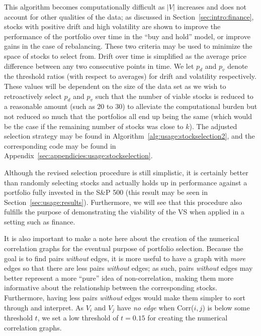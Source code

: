 This algorithm becomes computationally difficult as $|V|$ increases and does 
not account for other qualities of the data; as discussed in 
Section~\ref{sec:intro:finance}, stocks with positive drift and high volatility 
are shown to improve the performance of the portfolio over time in the ``buy 
and hold'' model, or improve gains in the case of rebalancing. These two 
criteria may be used to minimize the space of stocks to select from. Drift over 
time is simplified as the average price difference between any two consecutive 
points in time. We let $p_d$ and $p_v$ denote the threshold ratios
(with respect to averages) for drift and volatility respectively. These 
values will be dependent on the size of the data set as we wish to 
retroactively select $p_d$ and $p_v$ such that the number of viable stocks is 
reduced to a reasonable amount (such as 20 to 30) to alleviate the 
computational 
burden but not reduced so much that the portfolios all end up being the same 
(which would be the case if the 
remaining number of stocks was close to $k$). The adjusted selection strategy 
may be found in Algorithm~\ref{alg:usage:stockselection2}, and the 
corresponding code may be found in 
Appendix~\ref{sec:appendicies:usage:stockselection}.

Although the revised selection procedure is still simplistic, it is certainly 
better than randomly selecting stocks and actually holds up in performance 
against a portfolio fully invested in the S\&P 500 (this result may be seen in 
Section~\ref{sec:usage:results}). Furthermore, we will see that this procedure 
also fulfills the purpose of demonstrating the viability of the VS when applied 
in a setting such as finance.

It is also important to make a note here about the creation of the numerical
correlation graphs for the eventual purpose of portfolio selection.
Because the goal is to find pairs \textit{without} edges, it is more useful to 
have a graph with \textit{more} edges so that there are less 
pairs \textit{without} edges; as such, pairs \textit{without} edges may better 
represent a more ``pure'' idea of non-correlation, making them more informative 
about the relationship between the corresponding stocks. Furthermore, having 
less pairs \textit{without} edges would make them simpler to sort through and 
interpret.
As $V_i$ and $V_j$ have \textit{no edge} when Corr($i,j$) is below some 
threshold $t$, we set a low threshold of $t = 0.15$ 
for creating the numerical correlation graphs.

